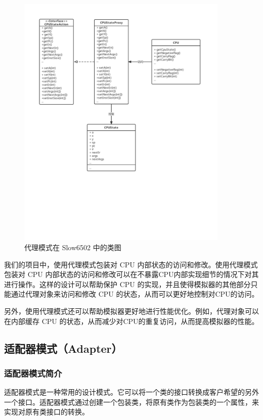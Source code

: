 \documentclass[cn,black,12pt,normal]{elegantnote}
\begin{document}
\begin{figure}[H]
  \centering
  \includegraphics[width=0.9\textwidth]{figures/Proxy.pdf}
  \caption{代理模式在 Slow6502 中的类图}
\end{figure}

我们的项目中，使用代理模式包装对 CPU 内部状态的访问和修改。使用代理模式包装对 CPU 内部状态的访问和修改可以在不暴露CPU内部实现细节的情况下对其进行操作。这样的设计可以帮助保护 CPU 的实现，并且使得模拟器的其他部分只能通过代理对象来访问和修改 CPU 的状态，从而可以更好地控制对CPU的访问。

另外，使用代理模式还可以帮助模拟器更好地进行性能优化。例如，代理对象可以在内部缓存 CPU 的状态，从而减少对CPU的重复访问，从而提高模拟器的性能。

\subsection{适配器模式（Adapter）}

\subsubsection{适配器模式简介}

适配器模式是一种常用的设计模式。它可以将一个类的接口转换成客户希望的另外一个接口。适配器模式通过创建一个包装类，将原有类作为包装类的一个属性，来实现对原有类接口的转换。
\end{document}
